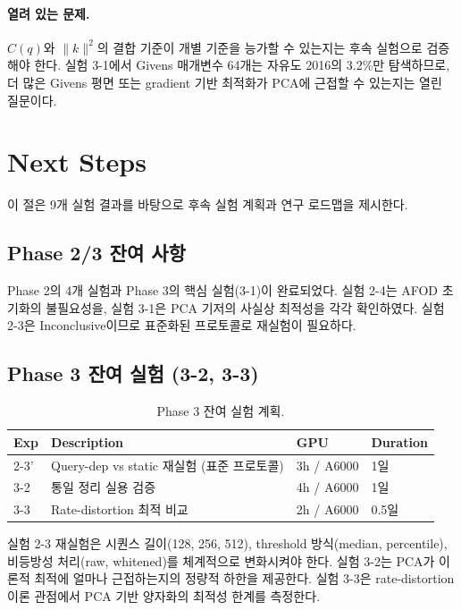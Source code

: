 \documentclass[11pt,a4paper]{article}
\begin{document}
\paragraph{열려 있는 문제.}
$C(q)$와 $\|k\|^2$의 결합 기준이 개별 기준을 능가할 수 있는지는 후속 실험으로 검증해야 한다.
실험 3-1에서 Givens 매개변수 64개는 자유도 2016의 3.2\%만 탐색하므로, 더 많은 Givens 평면 또는 gradient 기반 최적화가 PCA에 근접할 수 있는지는 열린 질문이다.

\newpage
\section{Next Steps}

이 절은 9개 실험 결과를 바탕으로 후속 실험 계획과 연구 로드맵을 제시한다.

\subsection{Phase 2/3 잔여 사항}

Phase 2의 4개 실험과 Phase 3의 핵심 실험(3-1)이 완료되었다.
실험 2-4는 AFOD 초기화의 불필요성을, 실험 3-1은 PCA 기저의 사실상 최적성을 각각 확인하였다.
실험 2-3은 Inconclusive이므로 표준화된 프로토콜로 재실험이 필요하다.

\subsection{Phase 3 잔여 실험 (3-2, 3-3)}

\begin{table}[H]
\centering
\caption{Phase 3 잔여 실험 계획.}
\begin{tabular}{llll}
\toprule
\textbf{Exp} & \textbf{Description} & \textbf{GPU} & \textbf{Duration} \\
\midrule
2-3' & Query-dep vs static 재실험 (표준 프로토콜) & 3h / A6000 & 1일 \\
3-2 & 통일 정리 실용 검증 & 4h / A6000 & 1일 \\
3-3 & Rate-distortion 최적 비교 & 2h / A6000 & 0.5일 \\
\bottomrule
\end{tabular}
\end{table}

실험 2-3 재실험은 시퀀스 길이(128, 256, 512), threshold 방식(median, percentile), 비등방성 처리(raw, whitened)를 체계적으로 변화시켜야 한다.
실험 3-2는 PCA가 이론적 최적에 얼마나 근접하는지의 정량적 하한을 제공한다.
실험 3-3은 rate-distortion 이론 관점에서 PCA 기반 양자화의 최적성 한계를 측정한다.
\end{document}
